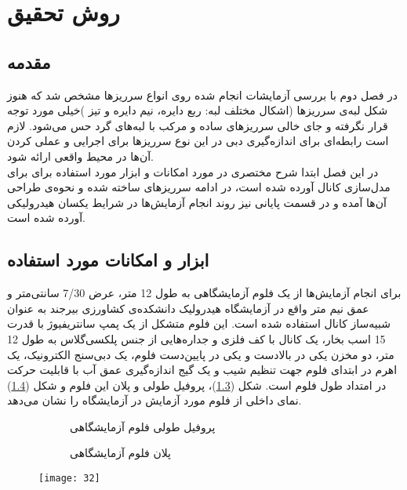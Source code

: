 \chapter{ روش تحقیق }
\section{مقدمه}\label{sec-model-motion}
در فصل دوم با بررسی آزمایشات انجام شده روی انواع سرریزها مشخص شد که هنوز شکل لبه‌ی سرریزها (اشکال مختلف لبه: ربع دایره، نیم دایره و تیز )خیلی مورد توجه قرار نگرفته و جای خالی سرریزهای ساده و مرکب با لبه‌های گرد حس می‌شود. لازم است رابطه‌ای برای اندازه‌گیری دبی در این نوع سرریزها برای اجرایی و عملی کردن آن‌ها در محیط واقعی ارائه شود.\\
در این فصل ابتدا شرح مختصری در مورد امکانات و ابزار مورد استفاده برای برای مدل‌سازی کانال آورده شده است، در ادامه سرریزهای ساخته شده و نحوه‌ی طراحی آن‌ها آمده و در قسمت پایانی نیز روند انجام آزمایش‌ها در شرایط یکسان هیدرولیکی آورده شده است.
\section{ابزار و امکانات مورد استفاده}
برای انجام آزمایش‌ها از یک فلوم آزمایشگاهی به طول 12 متر، عرض 7/30 سانتی‌متر و عمق نیم متر واقع در آزمایشگاه هیدرولیک دانشکده‌ی کشاورزی بیرجند به عنوان شبیه‌ساز کانال استفاده شده است. این فلوم متشکل از یک پمپ سانتریفیوژ با قدرت 15 اسب بخار، یک کانال با کف فلزی و جداره‌هایی از جنس پلکسی‌گلاس به طول 12 متر، دو مخزن یکی در بالادست و یکی در پایین‌دست فلوم، یک دبی‌سنج الکترونیک، یک اهرم در ابتدای فلوم جهت تنظیم شیب و یک گیج اندازه‌گیری عمق آب با قابلیت حرکت در امتداد طول فلوم است. شکل (\ref{fig25})، پروفیل طولی و پلان این فلوم و شکل (\ref{fig26}) نمای داخلی از فلوم مورد آزمایش در آزمایشگاه را نشان می‌دهد. 
\begin{figure}[h]
\centering
\begin{subfigure}{.5\textwidth}
    \leftline{
  \texttt{[image: 30]}
}
  \caption{ پروفیل طولی فلوم آزمایشگاهی    }
  \label{fig25.1}
\end{subfigure}%
\qquad 
\begin{subfigure}{.5\textwidth}
  \leftline{
  \texttt{[image: 31]}
}
  \caption{  پلان فلوم آزمایشگاهی             }
  \label{fig25.2}
\end{subfigure}
\caption{ }
\label{fig25}
\end{figure}

\begin{figure}[h]
 \centering
  \texttt{[image: 32]}
  \caption{    }
  \label{fig26}
\end{figure}

